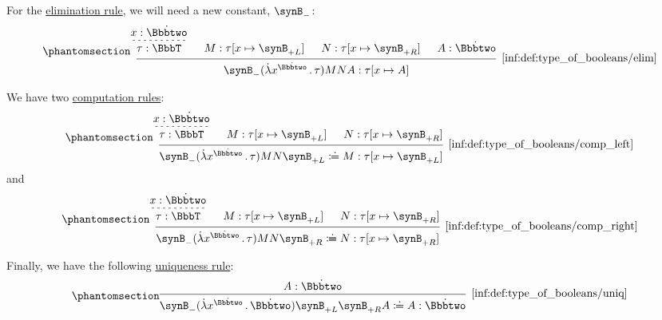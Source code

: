 \begin{definition}
  For the \hyperref[rem:type_theory_rule_classification/elim]{elimination rule}, we will need a new constant, \( \synB_- \):
  \begin{equation*}\taglabel[\ensuremath{ \Bbbtwo_- }]{inf:def:type_of_booleans/elim}
    \begin{prooftree}
      \hypo{ x: \syn\Bbbtwo }
      \infer[dashed]1{ \tau: \BbbT }

      \hypo{ M: \tau[x \mapsto \synB_{+L}] }
      \hypo{ N: \tau[x \mapsto \synB_{+R}] }

      \hypo{ A: \syn\Bbbtwo }

      \infer4[\ref{inf:def:type_of_booleans/elim}]{ \synB_- (\qabs {x^{\syn\Bbbtwo}} \tau) M N A: \tau[x \mapsto A] }
    \end{prooftree}
  \end{equation*}

  We have two \hyperref[rem:type_theory_rule_classification/equality/comp]{computation rules}:
  \begin{equation*}\taglabel[\ensuremath{ \Bbbtwo_\beta^L }]{inf:def:type_of_booleans/comp_left}
    \begin{prooftree}
      \hypo{ x: \syn\Bbbtwo }
      \infer[dashed]1{ \tau: \BbbT }

      \hypo{ M: \tau[x \mapsto \synB_{+L}] }
      \hypo{ N: \tau[x \mapsto \synB_{+R}] }

      \infer3[\ref{inf:def:type_of_booleans/comp_left}]{ \synB_- (\qabs {x^{\syn\Bbbtwo}} \tau) M N \synB_{+L} \syndefeq M: \tau[x \mapsto \synB_{+L}] }
    \end{prooftree}
  \end{equation*}
  and
  \begin{equation*}\taglabel[\ensuremath{ \Bbbtwo_\beta^R }]{inf:def:type_of_booleans/comp_right}
    \begin{prooftree}
      \hypo{ x: \syn\Bbbtwo }
      \infer[dashed]1{ \tau: \BbbT }

      \hypo{ M: \tau[x \mapsto \synB_{+L}] }
      \hypo{ N: \tau[x \mapsto \synB_{+R}] }

      \infer3[\ref{inf:def:type_of_booleans/comp_right}]{ \synB_- (\qabs {x^{\syn\Bbbtwo}} \tau) M N \synB_{+R} \syndefeq N: \tau[x \mapsto \synB_{+R}] }
    \end{prooftree}
  \end{equation*}

  Finally, we have the following \hyperref[rem:type_theory_rule_classification/equality/comp]{uniqueness rule}:
  \begin{equation*}\taglabel[\ensuremath{ \Bbbtwo_\eta }]{inf:def:type_of_booleans/uniq}
    \begin{prooftree}
      \hypo{ A: \syn\Bbbtwo }
      \infer1[\ref{inf:def:type_of_booleans/uniq}]{ \synB_- (\qabs {x^{\syn\Bbbtwo}} \syn\Bbbtwo) \synB_{+L} \synB_{+R} A \syndefeq A: \syn\Bbbtwo }
    \end{prooftree}
  \end{equation*}
\end{definition}


